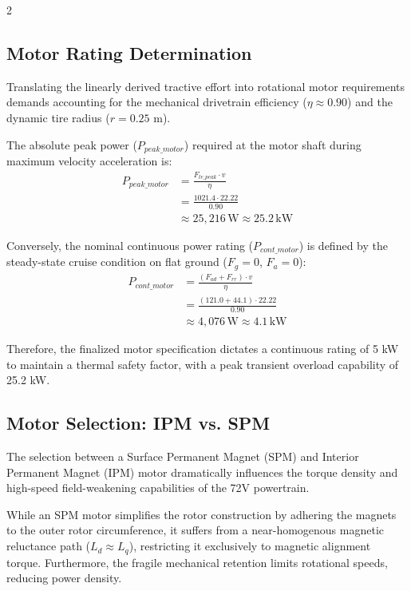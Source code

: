 \begin{multicols}{2}
\subsection{Motor Rating Determination}

Translating the linearly derived tractive effort into rotational motor requirements demands accounting for the mechanical drivetrain efficiency ($\eta \approx 0.90$) and the dynamic tire radius ($r = 0.25$ m).

The absolute peak power ($P_{peak\_motor}$) required at the motor shaft during maximum velocity acceleration is:
\begin{equation} \label{eq:motor_peak_pwr}
\begin{split}
P_{peak\_motor} &= \frac{F_{te\_peak} \cdot v}{\eta} \\
&= \frac{1021.4 \cdot 22.22}{0.90} \\
&\approx 25,216\,\mathrm{W} \approx 25.2\,\mathrm{kW}
\end{split}
\end{equation}

Conversely, the nominal continuous power rating ($P_{cont\_motor}$) is defined by the steady-state cruise condition on flat ground ($F_g = 0$, $F_a = 0$):
\begin{equation} \label{eq:motor_cont_pwr}
\begin{split}
P_{cont\_motor} &= \frac{(F_{ad} + F_{rr}) \cdot v}{\eta} \\
&= \frac{(121.0 + 44.1) \cdot 22.22}{0.90} \\
&\approx 4,076\,\mathrm{W} \approx 4.1\,\mathrm{kW}
\end{split}
\end{equation}

Therefore, the finalized motor specification dictates a continuous rating of 5 kW to maintain a thermal safety factor, with a peak transient overload capability of 25.2 kW.

\subsection{Motor Selection: IPM vs. SPM}

The selection between a Surface Permanent Magnet (SPM) and Interior Permanent Magnet (IPM) motor dramatically influences the torque density and high-speed field-weakening capabilities of the 72V powertrain.

While an SPM motor simplifies the rotor construction by adhering the magnets to the outer rotor circumference, it suffers from a near-homogenous magnetic reluctance path ($L_d \approx L_q$), restricting it exclusively to magnetic alignment torque. Furthermore, the fragile mechanical retention limits rotational speeds, reducing power density.


\end{multicols}
